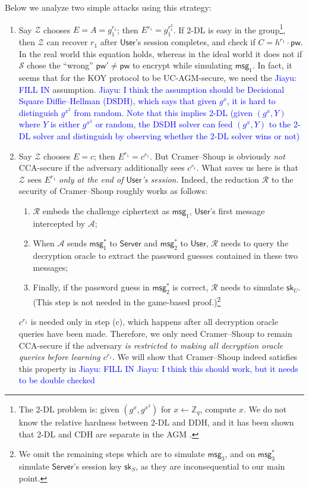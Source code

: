 \documentclass[10pt,a4paper]{article}
\newcommand{\simulator}{\mathcal{S}}
\newcommand{\env}{\mathcal{Z}}
\newcommand{\adv}{\mathcal{A}}
\newcommand{\red}{\mathcal{R}}
\newcommand{\user}{\mathsf{User}}
\newcommand{\sk}{\mathsf{sk}}
\newcommand{\pw}{\mathsf{pw}}
\newcommand{\server}{\mathsf{Server}}
\newcommand{\msg}[1]{\mathsf{msg}_{#1}}
\def\xjy#1{\textcolor{blue}{Jiayu: #1}}
\begin{document}
Below we analyze two simple attacks using this strategy:
\begin{enumerate}
  \item Say $\env$ chooses $E = A = g_1^{r_1}$; then $E^{r_1} = g_1^{r_1^2}$. If 2-DL is easy in the group\footnote{The 2-DL problem is: given $(g^x,g^{x^2})$ for $x \gets \mathbb{Z}_q$, compute $x$. We do not know the relative hardness between 2-DL and DDH, and it has been shown that 2-DL and CDH are separate in the AGM \cite{C:BauFucLos20}.}, then $\env$ can recover $r_1$ after $\user$'s session completes, and check if $C = h^{r_1} \cdot \pw$. In the real world this equation holds, whereas in the ideal world it does not if $\simulator$ chose the ``wrong'' $\pw' \neq \pw$ to encrypt while simulating $\msg{1}$. In fact, it seems that for the KOY protocol to be UC-AGM-secure, we need the \xjy{FILL IN} assumption. \xjy{I think the assumption should be Decisional Square Diffie--Hellman (DSDH), which says that given $g^x$, it is hard to distinguish $g^{x^2}$ from random. Note that this implies 2-DL (given $(g^x,Y)$ where $Y$ is either $g^{x^2}$ or random, the DSDH solver can feed $(g^x,Y)$ to the 2-DL solver and distinguish by observing whether the 2-DL solver wins or not)}
  \item Say $\env$ chooses $E = c$; then $E^{r_1} = c^{r_1}$. But Cramer--Shoup is obviously \emph{not} CCA-secure if the adversary additionally sees $c^{r_1}$. What saves us here is that $\env$ sees $E^{r_1}$ \emph{only at the end of $\user$'s session}. Indeed, the reduction $\red$ to the security of Cramer--Shoup roughly works as follows:
      \begin{enumerate}
        \item $\red$ embeds the challenge ciphertext as $\msg{1}$, $\user$'s first message intercepted by $\adv$;
        \item When $\adv$ sends $\msg{1}^*$ to $\server$ and $\msg{2}^*$ to $\user$, $\red$ needs to query the decryption oracle to extract the password guesses contained in these two messages;
        \item Finally, if the password guess in $\msg{2}^*$ is correct, $\red$ needs to simulate $\sk_U$. (This step is not needed in the game-based proof.)\footnote{We omit the remaining steps which are to simulate $\msg{3}$, and on $\msg{3}^*$ simulate $\server$'s session key $\sk_S$, as they are inconsequential to our main point.}
      \end{enumerate}
      $c^{r_1}$ is needed only in step (c), which happens after all decryption oracle queries have been made. Therefore, we only need Cramer--Shoup to remain CCA-secure if the adversary \emph{is restricted to making all decryption oracle queries before learning $c^{r_1}$}. We will show that Cramer--Shoup indeed satisfies this property in \xjy{FILL IN} \xjy{I think this should work, but it needs to be double checked}
\end{enumerate}
\end{document}
